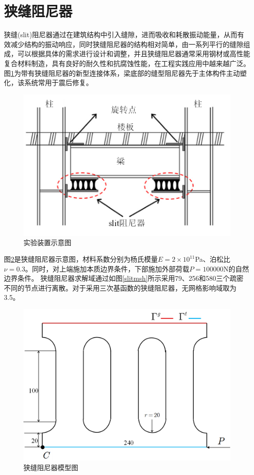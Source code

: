 \section{狭缝阻尼器}
狭缝(slit)阻尼器通过在建筑结构中引入缝隙，进而吸收和耗散振动能量，从而有效减少结构的振动响应，同时狭缝阻尼器的结构相对简单，由一系列平行的缝隙组成，可以根据具体的需求进行设计和调整，并且狭缝阻尼器通常采用钢材或高性能复合材料制造，具有良好的耐久性和抗腐蚀性能，在工程实践应用中越来越广泛。
图\ref{slit1}为带有狭缝阻尼器的新型连接体系，梁底部的缝型阻尼器先于主体构件主动塑化，该系统常用于震后修复。
\begin{figure}[H]
    \centering
    \includegraphics[scale=0.7]{figure/DAMPER/SLIT/1.png}
    \caption{实验装置示意图\cite{oh2009}}\label{slit1}
\end{figure}
图\ref{slit2}是狭缝阻尼器示意图，材料系数分别为杨氏模量$E=2\times 10^{11}$Pa、泊松比$\nu=0.3$。同时，对上端施加本质边界条件，下部施加外部荷载$P=100000$N的自然边界条件。
狭缝阻尼器求解域通过如图\ref{slitmsh}所示采用79、256和580三个疏密不同的节点进行离散。对于采用三次基函数的狭缝阻尼器，无网格影响域取为3.5。
\begin{figure}[H]
    \centering
    \includegraphics[scale=0.5]{figure/DAMPER/SLIT/2.png}
    \caption{狭缝阻尼器模型图}\label{slit2}
\end{figure}
